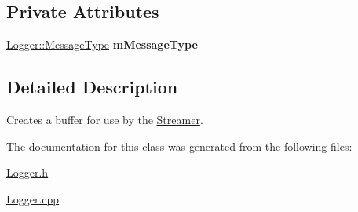 \subsection*{Private Attributes}
\begin{DoxyCompactItemize}
\item 
\hypertarget{class_logger_1_1_streamer_1_1_string_buffer_acbec8fa6b52fd109de419019b8ab3cb2}{}\hyperlink{class_logger_ad09ea848c6228767e3ad1085da600cd8}{Logger\+::\+Message\+Type} {\bfseries m\+Message\+Type}\label{class_logger_1_1_streamer_1_1_string_buffer_acbec8fa6b52fd109de419019b8ab3cb2}

\end{DoxyCompactItemize}


\subsection{Detailed Description}
Creates a buffer for use by the \hyperlink{class_logger_1_1_streamer}{Streamer}. 

The documentation for this class was generated from the following files\+:\begin{DoxyCompactItemize}
\item 
\hyperlink{_logger_8h}{Logger.\+h}\item 
\hyperlink{_logger_8cpp}{Logger.\+cpp}\end{DoxyCompactItemize}
